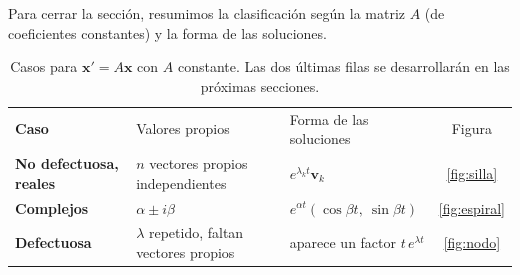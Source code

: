 Para cerrar la secci\'on, resumimos la clasificaci\'on seg\'un la matriz $A$ (de coeficientes constantes) y la forma de las soluciones.

\begin{table}[H]
\centering
\renewcommand{\arraystretch}{1.4}
\begin{tabular}{>{\bfseries}l l l c}
\rowcolor{bbe!15}
\textcolor{bbe}{Caso} & \textcolor{bbe}{Valores propios} & \textcolor{bbe}{Forma de las soluciones} & \textcolor{bbe}{Figura}\\
No defectuosa, reales & $n$ vectores propios independientes & $e^{\lambda_k t}\mathbf v_k$ & \ref{fig:silla} \\
Complejos & $\alpha\pm i\beta$ & $e^{\alpha t}(\cos\beta t,\ \sin\beta t)$ & \ref{fig:espiral} \\
Defectuosa & $\lambda$ repetido, faltan vectores propios & aparece un factor $t\,e^{\lambda t}$ & \ref{fig:nodo} \\
\end{tabular}
\caption{Casos para $\mathbf x'=A\mathbf x$ con $A$ constante. Las dos \'ultimas filas se desarrollar\'an en las pr\'oximas secciones.}
\end{table}
